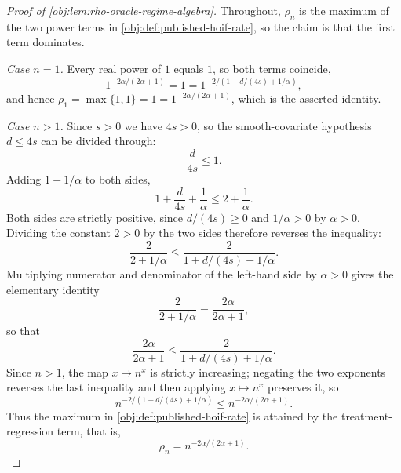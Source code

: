 \begin{proof}[Proof of \cref{obj:lem:rho-oracle-regime-algebra}]
Throughout, \(\rho_n\) is the maximum of the two power terms in \cref{obj:def:published-hoif-rate},
so the claim is that the first term dominates.

\emph{Case \(n=1\).} Every real power of \(1\) equals \(1\), so both terms coincide,
\[
1^{-2\alpha/(2\alpha+1)}=1=1^{-2/(1+d/(4s)+1/\alpha)},
\]
and hence \(\rho_1=\max\{1,1\}=1=1^{-2\alpha/(2\alpha+1)}\), which is the asserted identity.

\emph{Case \(n>1\).} Since \(s>0\) we have \(4s>0\), so the smooth-covariate hypothesis \(d\le 4s\) can
be divided through:
\[
\frac{d}{4s}\le 1 .
\]
Adding \(1+1/\alpha\) to both sides,
\[
1+\frac d{4s}+\frac1\alpha
\le
2+\frac1\alpha .
\]
Both sides are strictly positive, since \(d/(4s)\ge0\) and \(1/\alpha>0\) by \(\alpha>0\). Dividing
the constant \(2>0\) by the two sides therefore reverses the inequality:
\[
\frac{2}{2+1/\alpha}
\le
\frac{2}{1+d/(4s)+1/\alpha}.
\]
Multiplying numerator and denominator of the left-hand side by \(\alpha>0\) gives the elementary
identity
\[
\frac{2}{2+1/\alpha}
=
\frac{2\alpha}{2\alpha+1},
\]
so that
\[
\frac{2\alpha}{2\alpha+1}
\le
\frac{2}{1+d/(4s)+1/\alpha}.
\]
Since \(n>1\), the map \(x\mapsto n^{x}\) is strictly increasing; negating the two exponents reverses
the last inequality and then applying \(x\mapsto n^{x}\) preserves it, so
\[
n^{-2/(1+d/(4s)+1/\alpha)}
\le
n^{-2\alpha/(2\alpha+1)} .
\]
Thus the maximum in \cref{obj:def:published-hoif-rate} is attained by the treatment-regression
term, that is,
\[
\rho_n=n^{-2\alpha/(2\alpha+1)} .
\]
\end{proof}
